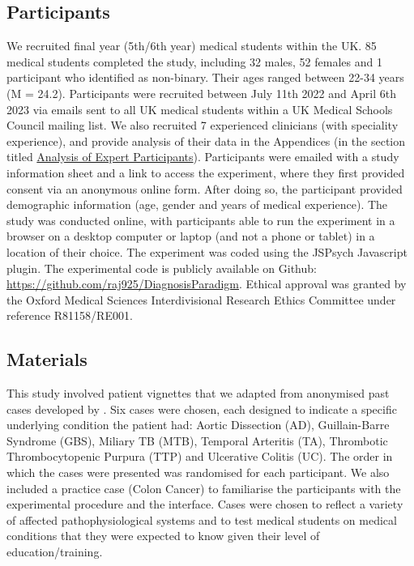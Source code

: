\documentclass[a4paper, nobind]{templates/ociamthesis}
\begin{document}
\subsection{Participants}\label{participants}

We recruited final year (5th/6th year) medical students within the UK. 85 medical students completed the study, including 32 males, 52 females and 1 participant who identified as non-binary. Their ages ranged between 22-34 years (M = 24.2). Participants were recruited between July 11th 2022 and April 6th 2023 via emails sent to all UK medical students within a UK Medical Schools Council mailing list. We also recruited 7 experienced clinicians (with speciality experience), and provide analysis of their data in the Appendices (in the section titled \hyperref[experts]{Analysis of Expert Participants}). Participants were emailed with a study information sheet and a link to access the experiment, where they first provided consent via an anonymous online form. After doing so, the participant provided demographic information (age, gender and years of medical experience). The study was conducted online, with participants able to run the experiment in a browser on a desktop computer or laptop (and not a phone or tablet) in a location of their choice. The experiment was coded using the JSPsych Javascript plugin. The experimental code is publicly available on Github: \url{https://github.com/raj925/DiagnosisParadigm}. Ethical approval was granted by the Oxford Medical Sciences Interdivisional Research Ethics Committee under reference R81158/RE001.

\subsection{Materials}\label{materials}

This study involved patient vignettes that we adapted from anonymised past cases developed by \textcite{friedman_are_2001}. Six cases were chosen, each designed to indicate a specific underlying condition the patient had: Aortic Dissection (AD), Guillain-Barre Syndrome (GBS), Miliary TB (MTB), Temporal Arteritis (TA), Thrombotic Thrombocytopenic Purpura (TTP) and Ulcerative Colitis (UC). The order in which the cases were presented was randomised for each participant. We also included a practice case (Colon Cancer) to familiarise the participants with the experimental procedure and the interface. Cases were chosen to reflect a variety of affected pathophysiological systems and to test medical students on medical conditions that they were expected to know given their level of education/training.\\
\end{document}
